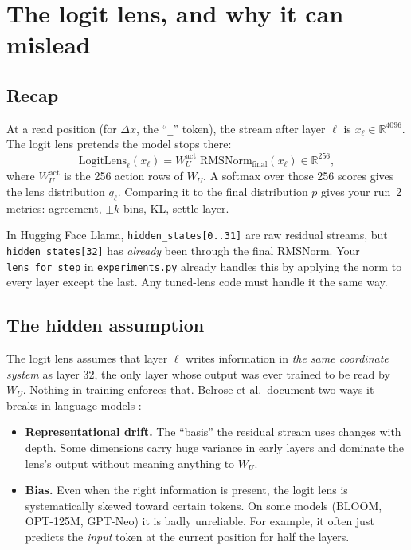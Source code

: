 \documentclass[11pt]{article}
\begin{document}
\section{The logit lens, and why it can mislead}

\subsection{Recap}
At a read position (for $\Delta x$, the ``\texttt{\_}'' token), the stream after layer $\ell$ is $x_\ell\in\mathbb{R}^{4096}$. The logit lens pretends the model stops there:
\begin{equation}
\text{LogitLens}_\ell(x_\ell) = W_U^{\text{act}}\;\mathrm{RMSNorm}_{\text{final}}(x_\ell)\in\mathbb{R}^{256},
\end{equation}
where $W_U^{\text{act}}$ is the 256 action rows of $W_U$. A softmax over those 256 scores gives the lens distribution $q_\ell$. Comparing it to the final distribution $p$ gives your run~2 metrics: agreement, $\pm k$ bins, KL, settle layer.

\begin{pitfall}
In Hugging Face Llama, \texttt{hidden\_states[0..31]} are raw residual streams, but \texttt{hidden\_states[32]} has \emph{already} been through the final RMSNorm. Your \texttt{lens\_for\_step} in \texttt{experiments.py} already handles this by applying the norm to every layer except the last. Any tuned-lens code must handle it the same way.
\end{pitfall}

\subsection{The hidden assumption}
The logit lens assumes that layer $\ell$ writes information in \emph{the same coordinate system} as layer 32, the only layer whose output was ever trained to be read by $W_U$. Nothing in training enforces that. Belrose et al.\ document two ways it breaks in language models \cite{belrose2023tuned}:
\begin{itemize}
  \item \textbf{Representational drift.} The ``basis'' the residual stream uses changes with depth. Some dimensions carry huge variance in early layers and dominate the lens's output without meaning anything to $W_U$.
  \item \textbf{Bias.} Even when the right information is present, the logit lens is systematically skewed toward certain tokens. On some models (BLOOM, OPT-125M, GPT-Neo) it is badly unreliable. For example, it often just predicts the \emph{input} token at the current position for half the layers.
\end{itemize}
\end{document}
